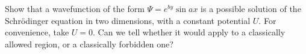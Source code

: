Show that a wavefunction of the form
$\Psi = e^{by} \sin ax $ is a possible solution of the Schr\"odinger equation
in two dimensions, with a constant potential $U$. For convenience, take $U=0$.
Can we tell whether it would apply to a classically allowed
region, or a classically forbidden one?

